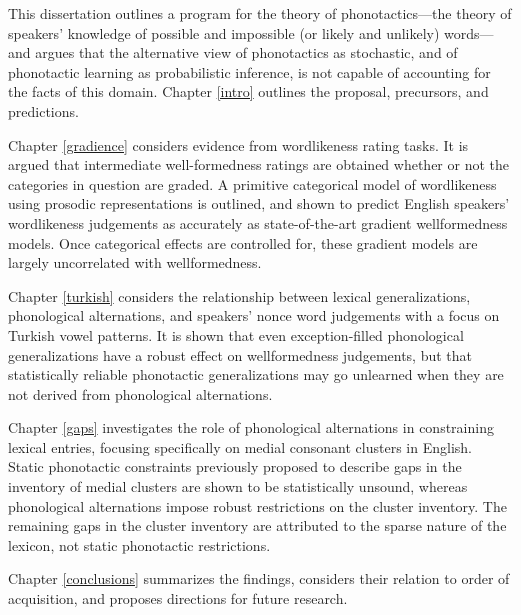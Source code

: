
This dissertation outlines a program for the theory of phonotactics---the theory of speakers' knowledge of possible and impossible (or likely and unlikely) words---and argues that the alternative view of phonotactics as stochastic, and of phonotactic learning as probabilistic inference, is not capable of accounting for the facts of this domain.
Chapter \ref{intro} outlines the proposal, precursors, and predictions.

Chapter \ref{gradience} considers evidence from wordlikeness rating tasks. It is argued that intermediate well-formedness ratings are obtained whether or not the categories in question are graded. 
A primitive categorical model of wordlikeness using prosodic representations is outlined, and shown to predict English speakers' wordlikeness judgements as accurately as state-of-the-art gradient wellformedness models. 
Once categorical effects are controlled for, these gradient models are largely uncorrelated with wellformedness.

Chapter \ref{turkish} considers the relationship between lexical generalizations, phonological alternations, and speakers' nonce word judgements with a focus on Turkish vowel patterns. 
It is shown that even exception-filled phonological generalizations have a robust effect on wellformedness judgements, but that statistically reliable phonotactic generalizations may go unlearned when they are not derived from phonological alternations.

Chapter \ref{gaps} investigates the role of phonological alternations in constraining lexical entries, focusing specifically on medial consonant clusters in English. 
Static phonotactic constraints previously proposed to describe gaps in the inventory of medial clusters are shown to be statistically unsound, whereas phonological alternations impose robust restrictions on the cluster inventory. 
The remaining gaps in the cluster inventory are attributed to the sparse nature of the lexicon, not static phonotactic restrictions.

Chapter \ref{conclusions} summarizes the findings, considers their relation to order of acquisition, and proposes directions for future research.
